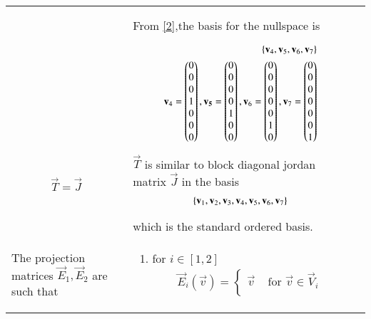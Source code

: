 \documentclass[journal,12pt,onecolumn]{IEEEtran}
\begin{document}
\begin{longtable}{|p{5cm}|p{13cm}|}
{\begin{align}
\end{align}}\\
& From \eqref{2},the basis for the nullspace is\\
& \parbox{12cm}{\begin{align}
    \left\{\mathbf{v}_4,\mathbf{v}_5,\mathbf{v}_6,\mathbf{v}_7\right\}\\
    \mathbf{v}_4=\begin{pmatrix}0\\0\\0\\1\\0\\0\\0\end{pmatrix},\mathbf{v_5}=\begin{pmatrix}0\\0\\0\\0\\1\\0\\0\end{pmatrix},\mathbf{v}_6=\begin{pmatrix}0\\0\\0\\0\\0\\1\\0\end{pmatrix},\mathbf{v}_7=\begin{pmatrix}0\\0\\0\\0\\0\\0\\1\end{pmatrix}
\end{align}}\\
\hline
\begin{align}
    \vec{T}=\vec{J}
\end{align}&
$\vec{T}$ is similar to block diagonal jordan matrix $\vec{J}$ in the basis 
\parbox{12cm}{\begin{align}
    \left\{\mathbf{v}_1,\mathbf{v}_2,\mathbf{v}_3,\mathbf{v}_4,\mathbf{v}_5,\mathbf{v}_6,\mathbf{v}_7\right\}
\end{align}}\\
& which is the standard ordered basis.
\hline
{}\\
\hline
The projection matrices $\vec{E}_1,\vec{E}_2$ are such that&
\parbox{12cm}{ \begin{enumerate}
       \item for $i \in [1,2]$\begin{align}
           \vec{E}_i(\vec{v})=\begin{cases}
          \vec{v} & \text{ for }  \vec{v} \in \vec{V}_i\\

\end{cases}
\end{align}
\end{enumerate}}
\end{longtable}
\end{document}
